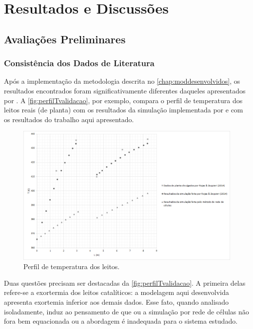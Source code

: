 %
% 
%
\chapter{Resultados e Discussões} \label{chap:resultados}

\section{Avaliações Preliminares} \label{sec:avaliacoesespreliminares}

\subsection{Consistência dos Dados de Literatura}
\label{sec:dadosliteratura}

Após a implementação da metodologia descrita no \autoref{chap:moddesenvolvidos},
os resultados encontrados foram significativamente diferentes daqueles apresentados
por . A \autoref{fig:perfilTvalidacao}, por
exemplo, compara o perfil de temperatura dos leitos reais (de planta) com os
resultados da simulação implementada por  e com os
resultados do trabalho aqui apresentado.

\begin{figure}[htb]
\centering \includegraphics[scale=0.4]{images/Chap4/perfilTvalidacao.png}
\caption{Perfil de temperatura dos leitos.}
\label{fig:perfilTvalidacao}
\end{figure}

Duas questões precisam ser destacadas da \autoref{fig:perfilTvalidacao}.
A primeira delas refere-se a exortermia dos leitos catalíticos: a modelagem aqui
desenvolvida apresenta exortemia inferior aos demais dados. Esse fato, quando
analisado isoladamente, induz ao pensamento de que ou a simulação por rede de
células não fora bem equacionada ou a abordagem é inadequada para o sistema
estudado.

